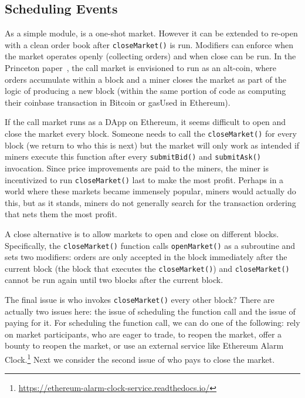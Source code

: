 \subsection{Scheduling Events}

As a simple module, \cm is a one-shot market. However it can be extended to re-open with a clean order book after \texttt{closeMarket()} is run. Modifiers can enforce when the market operates openly (collecting orders) and when close can be run. In the Princeton paper~\cite{clark2014decentralizing}, the call market is envisioned to run as an alt-coin, where orders accumulate within a block and a miner closes the market as part of the logic of producing a new block (\ie within the same portion of code as computing their coinbase transaction in Bitcoin or gasUsed in Ethereum). 

If the call market runs as a DApp on Ethereum, it seems difficult to open and close the market every block. Someone needs to call the \texttt{closeMarket()} for every block (we return to who this is next) but the market will only work as intended if miners execute this function after every \texttt{submitBid()} and \texttt{submitAsk()} invocation. Since price improvements are paid to the miners, the miner is incentivized to run \texttt{closeMarket()} last to make the most profit. Perhaps in a world where these markets became immensely popular, miners would actually do this, but as it stands, miners do not generally search for the transaction ordering that nets them the most profit.

A close alternative is to allow markets to open and close on different blocks. Specifically, the \texttt{closeMarket()} function calls \texttt{openMarket()} as a subroutine and sets two modifiers: orders are only accepted in the block immediately after the current block (\ie the block that executes the \texttt{closeMarket()}) and \texttt{closeMarket()} cannot be run again until two blocks after the current block. 

The final issue is who invokes \texttt{closeMarket()} every other block? There are actually two issues here: the issue of scheduling the function call and the issue of paying for it. For scheduling the function call, we can do one of the following: rely on market participants, who are eager to trade, to reopen the market, offer a bounty to reopen the market, or use an external service like Ethereum Alarm Clock.\footnote{\url{https://ethereum-alarm-clock-service.readthedocs.io/}} Next we consider the second issue of who pays to close the market. 

